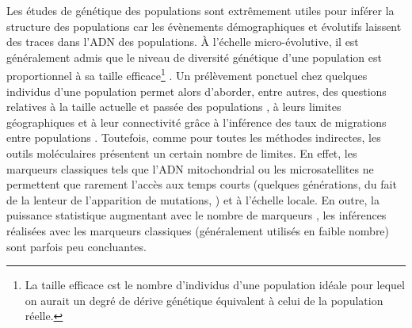 \documentclass[a4paper,12pt,twoside]{article}\usepackage[]{graphicx}\usepackage[]{color}
\begin{document}
\begin {bibunit} [newbst]
Les études de génétique des populations sont extrêmement utiles pour inférer la structure des populations car les évènements démographiques et évolutifs laissent des traces dans l'ADN des populations. À l'échelle micro-évolutive, il est généralement admis que le niveau de diversité génétique d'une population est proportionnel à sa taille efficace\footnote{La taille efficace cst le nombre d'individus d'une population idéale pour lequel on aurait un degré de dérive génétique équivalent à celui de la population réelle. } \citep[voir][pour une discussion à ce sujet]{bazin2006population, MK06a, Ey06}. Un prélèvement ponctuel chez quelques individus d'une population permet alors d'aborder, entre autres, des questions relatives à la taille actuelle et passée des populations \citep{tajima1989effect, beerli2001maximum}, à leurs limites géographiques \citep{franccois2010spatially, guillot2012} et à leur connectivité grâce à l'inférence des taux de migrations entre populations \citep{wilson2003bayesian}. Toutefois, comme pour toutes les méthodes indirectes, les outils moléculaires présentent un certain nombre de limites. En effet, les marqueurs classiques tels que l'ADN mitochondrial ou les microsatellites ne permettent que rarement l'accès aux temps courts (quelques générations, du fait de la lenteur de l'apparition de mutations, \citealp{drake1998rates}) et à l'échelle locale. En outre, la puissance statistique augmentant avec le nombre de marqueurs \citep{waples1998separating, latch2006relative}, les inférences réalisées avec les marqueurs classiques (généralement utilisés en faible nombre) sont parfois peu concluantes. 


\end{bibunit}
\end{document}
